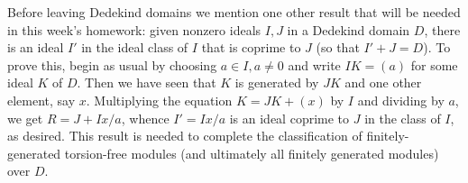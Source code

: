 \documentclass[10pt]{article}
\begin{document}
Before leaving Dedekind domains we mention one other result that will be
needed in this week's homework: given nonzero ideals $I,J$ in a Dedekind
domain $D$, there is an ideal $I'$ in the ideal class of $I$ that is
coprime to $J$ (so that $I'+J = D$). To prove this, begin as usual by
choosing $a\in I, a\ne0$ and write $IK = (a)$ for some ideal $K$ of $D$.
Then we have seen that $K$ is generated by $JK$ and one other element,
say $x$. Multiplying the equation $K = JK + (x)$ by $I$ and dividing by
$a$, we get $R = J + Ix/a$, whence $I' = Ix/a$ is an ideal coprime to
$J$ in the class of $I$, as desired. This result is needed to complete
the classification of finitely-generated torsion-free modules (and
ultimately all finitely generated modules) over $D$.
\end{document}
